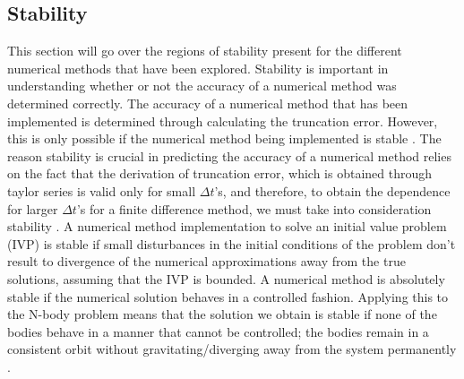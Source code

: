 \documentclass[conf]{new-aiaa}
\begin{document}
    \subsection{Stability}
    This section will go over the regions of stability present for the different numerical methods that have been explored. Stability is important in understanding whether or not the accuracy of a numerical method was determined correctly\cite{NumSol}. The accuracy of a numerical method that has been implemented is determined through calculating the truncation error. However, this is only possible if the numerical method being implemented is stable \cite{UoV}. The reason stability is crucial in predicting the accuracy of a numerical method relies on the fact that the derivation of truncation error, which is obtained through taylor series is valid only for small $\Delta t$'s, and therefore, to obtain the dependence for larger $\Delta t$'s for a finite difference method, we must take into consideration stability \cite{LecAS}.
    A numerical method implementation to solve an initial value problem (IVP) is stable if small disturbances in the initial conditions of the problem don't result to divergence of the numerical approximations away from the true solutions, assuming that the IVP is bounded. A numerical method is absolutely stable if the numerical solution behaves in a controlled fashion. Applying this to the N-body problem means that the solution we obtain is stable if none of the bodies behave in a manner that cannot be controlled; the bodies remain in a consistent orbit without gravitating/diverging away from the system permanently \cite{DiffEq}.
    
\end{document}
